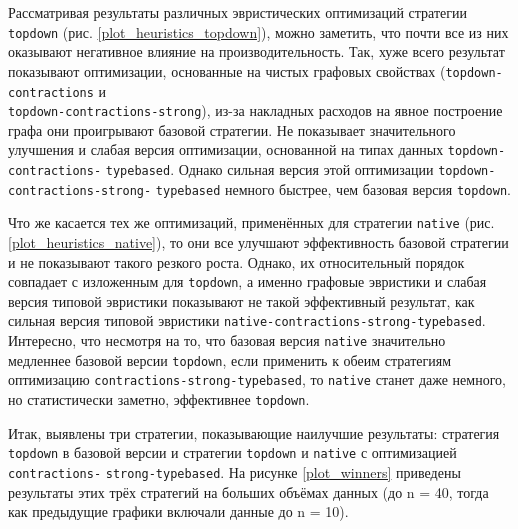 \documentclass[../thesis.tex]{subfiles}
\begin{document}
Рассматривая результаты различных эвристических оптимизаций стратегии \\\texttt{topdown} (рис. \ref{plot_heuristics_topdown}), можно заметить, что почти все из них оказывают негативное влияние на производительность. Так, хуже всего результат показывают оптимизации, основанные на чистых графовых свойствах (\texttt{topdown-contractions} и \\\texttt{topdown-contractions-strong}), из-за накладных расходов на явное построение графа они проигрывают базовой стратегии. Не показывает значительного улучшения и слабая версия оптимизации, основанной на типах данных \texttt{topdown-contractions-} \texttt{typebased}. Однако сильная версия этой оптимизации \texttt{topdown-contractions-strong-} \texttt{typebased} немного быстрее, чем базовая версия \texttt{topdown}.

Что же касается тех же оптимизаций, применённых для стратегии \texttt{native} (рис. \ref{plot_heuristics_native}), то они все улучшают эффективность базовой стратегии и не показывают такого резкого роста. Однако, их относительный порядок совпадает с изложенным для \texttt{topdown}, а именно графовые эвристики и слабая версия типовой эвристики показывают не такой эффективный результат, как сильная версия типовой эвристики \texttt{native-contractions-strong-typebased}. Интересно, что несмотря на то, что базовая версия \texttt{native} значительно медленнее базовой версии \texttt{topdown}, если применить к обеим стратегиям оптимизацию \texttt{contractions-strong-typebased}, то \texttt{native} станет даже немного, но статистически заметно, эффективнее \texttt{topdown}.

Итак, выявлены три стратегии, показывающие наилучшие результаты: стратегия \texttt{topdown} в базовой версии и стратегии \texttt{topdown} и \texttt{native} с оптимизацией \texttt{contractions-} \texttt{strong-typebased}. На рисунке \ref{plot_winners} приведены результаты этих трёх стратегий на больших объёмах данных (до n = 40, тогда как предыдущие графики включали данные до n = 10). 
\end{document}
